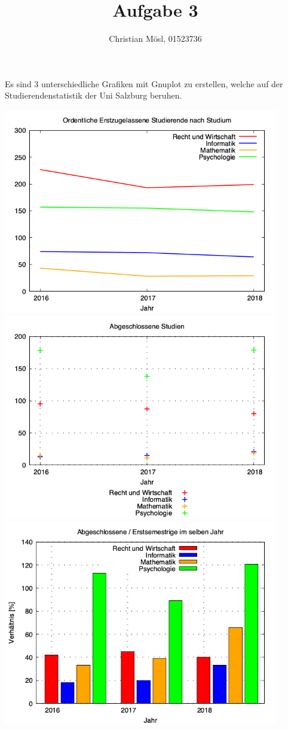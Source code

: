\documentclass{article}
\author{Christian M\"osl, 01523736}
\title{Aufgabe 3}
\date{}
\begin{document}
\maketitle

\paragraph{} 
Es sind 3 unterschiedliche Grafiken mit Gnuplot zu erstellen, welche auf der Studierendenstatistik der Uni Salzburg beruhen.
\vspace{1cm}

\includegraphics[width=12cm]{first-semester.png} \\
\vspace{1cm}
\includegraphics[width=12cm]{graduations.png} \\
\vspace{1cm}
\includegraphics[width=12cm]{factor.png} \\
\end{document}

